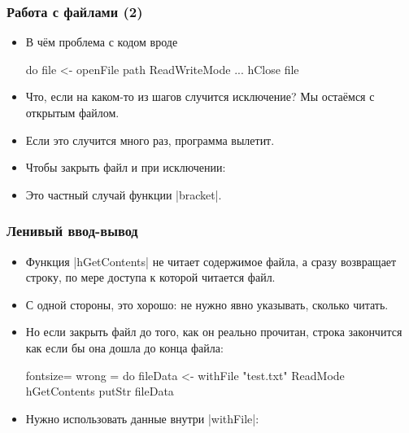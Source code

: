 \documentclass[11pt]{beamer}
\begin{document}
\begin{frame}[fragile]
  \frametitle{Работа с файлами (2)}
  \begin{itemize}
    \item В чём проблема с кодом вроде
          \begin{haskell}
    do
      file <- openFile path ReadWriteMode
      ...
      hClose file
    \end{haskell}
          \pause
    \item Что, если на каком-то из шагов случится исключение? Мы остаёмся с открытым файлом.
    \item Если это случится много раз, программа вылетит.
          \pause
    \item Чтобы закрыть файл и при исключении:
    \item Это частный случай функции \haskinline|bracket|.
  \end{itemize}
\end{frame}

\begin{frame}[fragile]
  \frametitle{Ленивый ввод-вывод}
  \begin{itemize}
    \item Функция \haskinline|hGetContents| не читает содержимое файла, а сразу возвращает строку, по мере доступа к которой читается файл.
    \item С одной стороны, это хорошо: не нужно явно указывать, сколько читать.
    \item Но если закрыть файл до того, как он реально прочитан, строка закончится как если бы она дошла до конца файла:
          \begin{haskell*}{fontsize=\footnotesize}
            wrong = do
            fileData <- withFile "test.txt" ReadMode hGetContents
            putStr fileData
          \end{haskell*}
    \item Нужно использовать данные внутри \haskinline|withFile|:
  \end{itemize}
\end{frame}
\end{document}

